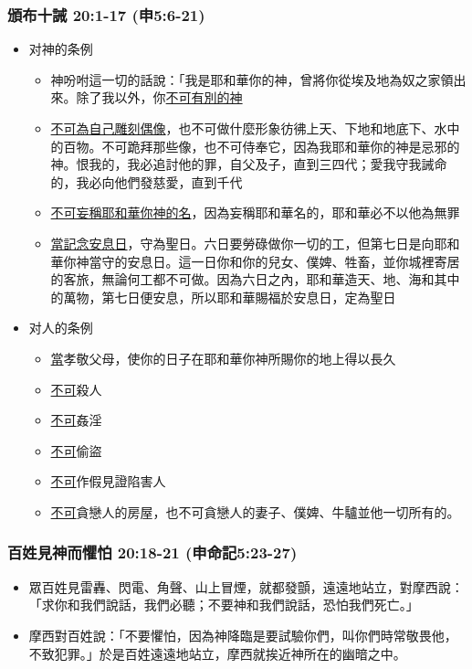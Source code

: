 \subsubsection{頒布十誡 20:1-17 (申5:6-21)}
\begin{itemize} 
\itemsep-.35em
\item 对神的条例
\begin{itemize} 
\itemsep-.35em
\item 神吩咐這一切的話說：「我是耶和華你的神，曾將你從埃及地為奴之家領出來。除了我以外，你\underline{不可有別的神}
\item \underline{不可為自己雕刻偶像}，也不可做什麼形象彷彿上天、下地和地底下、水中的百物。不可跪拜那些像，也不可侍奉它，因為我耶和華你的神是忌邪的神。恨我的，我必追討他的罪，自父及子，直到三四代；愛我守我誡命的，我必向他們發慈愛，直到千代
\item \underline{不可妄稱耶和華你神的名}，因為妄稱耶和華名的，耶和華必不以他為無罪
\item \underline{當記念安息日}，守為聖日。六日要勞碌做你一切的工，但第七日是向耶和華你神當守的安息日。這一日你和你的兒女、僕婢、牲畜，並你城裡寄居的客旅，無論何工都不可做。因為六日之內，耶和華造天、地、海和其中的萬物，第七日便安息，所以耶和華賜福於安息日，定為聖日
\end{itemize}
\item 对人的条例
\begin{itemize} 
\itemsep-.35em
\item \underline{當}孝敬父母，使你的日子在耶和華你神所賜你的地上得以長久
\item \underline{不可}殺人
\item \underline{不可}姦淫
\item \underline{不可}偷盜
\item \underline{不可}作假見證陷害人
\item \underline{不可}貪戀人的房屋，也不可貪戀人的妻子、僕婢、牛驢並他一切所有的。
\end{itemize}
\end{itemize}


\subsubsection{百姓見神而懼怕 20:18-21 (申命記5:23-27)}
\begin{itemize} 
\itemsep-.35em
\item 眾百姓見雷轟、閃電、角聲、山上冒煙，就都發顫，遠遠地站立，對摩西說：「求你和我們說話，我們必聽；不要神和我們說話，恐怕我們死亡。」 
\item 摩西對百姓說：「不要懼怕，因為神降臨是要試驗你們，叫你們時常敬畏他，不致犯罪。」於是百姓遠遠地站立，摩西就挨近神所在的幽暗之中。
\end{itemize}


